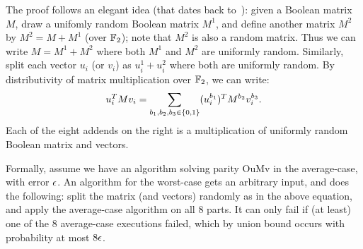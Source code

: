 \documentclass[letter,11pt]{article}
\newcommand{\oumv}{\textnormal{\textsf{OuMv}}\xspace}
\begin{document}
The proof follows an elegant idea (that dates back to~\cite{BLR93}): given a Boolean matrix $M$, draw a unifomly random Boolean matrix $M^1$, and define another matrix $M^2$ by $M^2 = M + M^1$ (over $\mathbb{F}_2$); note that $M^2$ is also a random matrix. 
Thus we can write $M = M^1 + M^2$ where both $M^1$ and $M^2$ are uniformly random.
Similarly, split each vector $u_i$ (or $v_i$) as $u_i^1 + u_i^2$ where both are uniformly random.
By distributivity of matrix multiplication over $\mathbb{F}_2$, we can write:
    \[
\begin{aligned}
	u_i ^T M v_i = \sum_{b_1, b_2, b_3\in \{0,1\}} (u_i^{b_1})^T M^{b_2} v_i^{b_3} .
\end{aligned}
\]
Each of the eight addends on the right is a multiplication of uniformly random Boolean matrix and vectors.

Formally, assume we have an algorithm solving parity \oumv in the average-case, with error $\epsilon$.
An algorithm for the worst-case gets an arbitrary input, and does the following: split the matrix (and vectors) randomly as in the above equation, and apply the average-case algorithm on all $8$ parts. 
It can only fail if (at least) one of the $8$ average-case executions failed, which by union bound occurs with probability at most $8\epsilon$.



 
 
\end{document}
